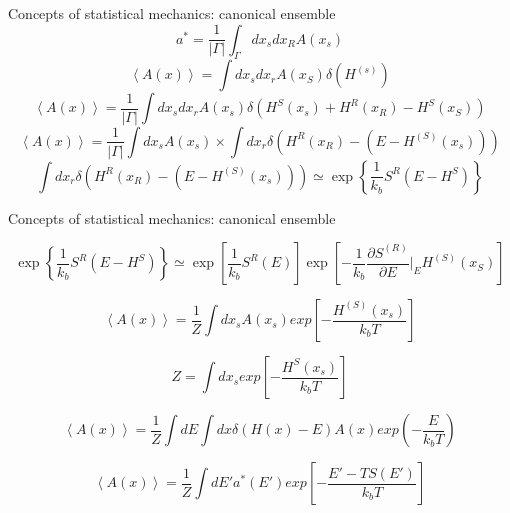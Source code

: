 \documentclass{beamer}
\begin{document}
\begin{frame}{Concepts of statistical mechanics: canonical ensemble}
\begin{equation}
a^{*}=\frac{1}{|\Gamma|}\int_{\Gamma}dx_{s}dx_{R} A(x_{s})
\end{equation}
\begin{equation}
\left\langle A(x) \right\rangle=\int dx_{s}dx_{r}A(x_{S})\delta(H^{(s)})
\end{equation}
\begin{equation}
\left\langle A(x) \right\rangle=\frac{1}{|\Gamma|}\int dx_{s}dx_{r}A(x_{s})\delta(H^{S}(x_{s})+H^{R}(x_{R})-H^{S}(x_{S}))
\end{equation}
\begin{equation}
\left\langle A(x) \right\rangle=\frac{1}{|\Gamma|}\int  dx_{s}A(x_{s})\times\int dx_{r}\delta(H^{R}(x_{R})-(E-H^{(S)}(x_{s})))
\end{equation}
\begin{equation}
\int dx_{r}\delta(H^{R}(x_{R})-(E-H^{(S)}(x_{s})))\simeq \exp\left\lbrace\frac{1}{k_{b}} S^{R}(E-H^{S})\right\rbrace
\end{equation}


\end{frame}


\begin{frame}{Concepts of statistical mechanics: canonical ensemble}

\begin{equation}
\exp\left\lbrace\frac{1}{k_{b}} S^{R}(E-H^{S})\right\rbrace \simeq  \exp \left[ \frac{1}{k_{b}}S^{R}(E)      \right] \exp\left[  -\frac{1}{k_{b}}\frac{\partial S^{(R)}}{\partial E}|_{E}  H^{(S)}(x_{S})  \right]
\end{equation}

\begin{equation}
\left\langle A(x) \right\rangle=\dfrac{1}{Z}\int dx_{s}A(x_{s})exp\left[ -\frac{H^{(S)}(x_{s})}{k_{b}T} \right]
\end{equation}

\begin{equation}
Z=\int dx_{s}exp\left[  -\frac{H^{S}(x_{s})}{k_{b}T}  \right]
\end{equation}


\begin{equation}
\left\langle A(x) \right\rangle=\dfrac{1}{Z}\int dE\int dx\delta(H(x)-E)A(x)exp(-\dfrac{E}{k_{b}T})
\end{equation}

\begin{equation}
\left\langle A(x) \right\rangle=\dfrac{1}{Z}\int dE'a^{*}(E')exp\left[ - \dfrac{E'-TS(E')}{k_{b}T}\right]
\end{equation}


\end{frame}
\end{document}
